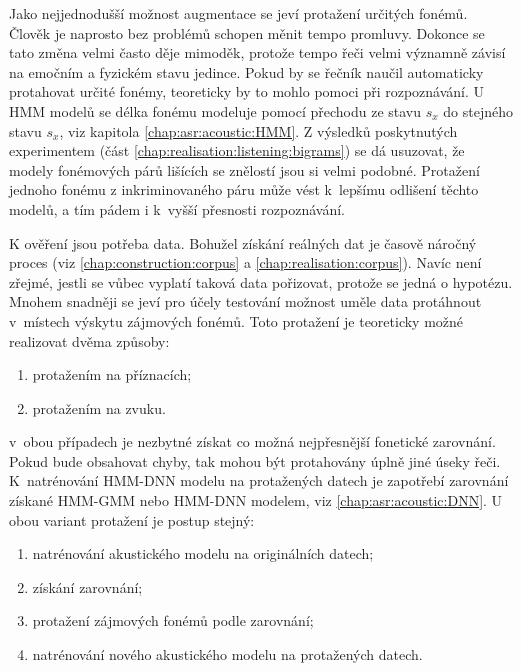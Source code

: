 Jako nejjednodušší možnost augmentace se jeví protažení určitých fonémů.
Člověk je naprosto bez problémů schopen měnit tempo promluvy.
Dokonce se tato změna velmi často děje mimoděk, protože tempo řeči velmi významně závisí na emočním a fyzickém stavu jedince.
Pokud by se řečník naučil automaticky protahovat určité fonémy, teoreticky by to mohlo pomoci při rozpoznávání.
U HMM modelů se délka fonému modeluje pomocí přechodu ze stavu $s_x$ do stejného stavu $s_x$, viz kapitola \ref{chap:asr:acoustic:HMM}.
Z výsledků poskytnutých  experimentem (část \ref{chap:realisation:listening:bigrams}) se dá usuzovat, že modely fonémových párů lišících se znělostí jsou si velmi podobné.
Protažení jednoho fonému z inkriminovaného páru může vést  k~lepšímu odlišení těchto modelů,
a tím pádem i  k~vyšší přesnosti rozpoznávání.

K ověření jsou potřeba data.
Bohužel získání reálných dat je časově náročný proces (viz \ref{chap:construction:corpus} a \ref{chap:realisation:corpus}).
Navíc není zřejmé, jestli se vůbec vyplatí taková data pořizovat, protože se jedná o hypotézu.
Mnohem snadněji se jeví pro účely testování možnost uměle data protáhnout v~místech výskytu zájmových fonémů.
Toto protažení je teoreticky možné realizovat dvěma způsoby:

\begin{enumerate}
  \item protažením na příznacích;
  \item protažením na zvuku.
\end{enumerate}

\noindent v~obou případech je nezbytné získat co možná nejpřesnější fonetické zarovnání. Pokud bude obsahovat chyby, tak mohou být protahovány úplně jiné úseky řeči. K~natrénování HMM-DNN modelu na protažených datech je zapotřebí zarovnání získané HMM-GMM nebo HMM-DNN modelem, viz \ref{chap:asr:acoustic:DNN}. U obou variant protažení je postup stejný:

\begin{enumerate}
  \item natrénování akustického modelu na originálních datech;
  \item získání zarovnání;
  \item protažení zájmových fonémů podle zarovnání;
  \item natrénování nového akustického modelu na protažených datech.
\end{enumerate}

